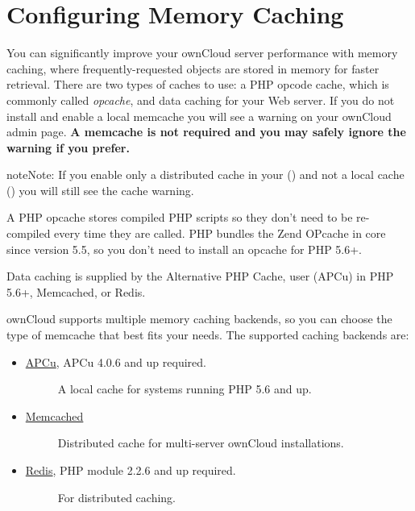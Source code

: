 \documentclass[letterpaper,10pt,english]{sphinxmanual}
\begin{document}
\section{Configuring Memory Caching}
\label{configuration_server/caching_configuration:configuring-memory-caching}\label{configuration_server/caching_configuration::doc}
You can significantly improve your ownCloud server performance with memory
caching, where frequently-requested objects are stored in memory for faster
retrieval. There are two types of caches to use: a PHP opcode cache, which is
commonly called \emph{opcache}, and data caching for your Web server. If you do not
install and enable a local memcache you will see a warning on your ownCloud
admin page. \textbf{A memcache is not required and you may safely ignore the warning
if you prefer.}

\begin{notice}{note}{Note:}
If you enable only a distributed cache in
your  () and not a
local cache () you will still see the cache warning.
\end{notice}

A PHP opcache stores compiled PHP scripts so they don't need to be re-compiled
every time they are called. PHP bundles the Zend OPcache in core since version
5.5, so you don't need to install an opcache for PHP 5.6+.

Data caching is supplied by the Alternative PHP Cache, user (APCu) in PHP
5.6+, Memcached, or Redis.

ownCloud supports multiple memory caching backends, so you can choose the type
of memcache that best fits your needs. The supported caching backends are:
\begin{itemize}
\item {} \begin{description}
\item[{\href{https://pecl.php.net/package/APCu}{APCu}, APCu 4.0.6 and up required.}] \leavevmode
A local cache for systems running PHP 5.6 and up.

\end{description}

\item {} \begin{description}
\item[{\href{http://www.memcached.org/}{Memcached}}] \leavevmode
Distributed cache for multi-server ownCloud installations.

\end{description}

\item {} \begin{description}
\item[{\href{http://redis.io/}{Redis}, PHP module 2.2.6 and up required.}] \leavevmode
For distributed caching.

\end{description}

\end{itemize}
\end{document}
